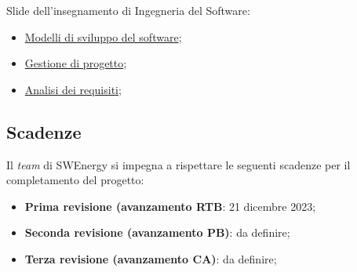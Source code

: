 Slide dell'insegnamento di Ingegneria del Software:
\begin{itemize}
	\item \href{https://www.math.unipd.it/~tullio/IS-1/2023/Dispense/T3.pdf}
	      {Modelli di sviluppo del software};
	\item \href{https://www.math.unipd.it/~tullio/IS-1/2023/Dispense/T4.pdf}
	      {Gestione di progetto};
	\item \href{https://www.math.unipd.it/~tullio/IS-1/2023/Dispense/T5.pdf}
	      {Analisi dei requisiti};
\end{itemize}

\subsection{Scadenze}
Il \textit{team} di SWEnergy si impegna a rispettare le seguenti scadenze per il
completamento del progetto:
\begin{itemize}
	\item \textbf{Prima revisione (avanzamento RTB}: 21 dicembre 2023;
	\item \textbf{Seconda revisione (avanzamento PB)}: da definire;
	\item \textbf{Terza revisione (avanzamento CA)}: da definire;
\end{itemize}
